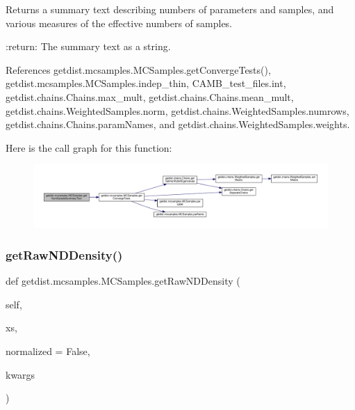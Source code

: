 \begin{DoxyVerb}Returns a summary text describing numbers of parameters and samples, 
and various measures of the effective numbers of samples.

:return: The summary text as a string.
\end{DoxyVerb}
 

References getdist.\+mcsamples.\+M\+C\+Samples.\+get\+Converge\+Tests(), getdist.\+mcsamples.\+M\+C\+Samples.\+indep\+\_\+thin, C\+A\+M\+B\+\_\+test\+\_\+files.\+int, getdist.\+chains.\+Chains.\+max\+\_\+mult, getdist.\+chains.\+Chains.\+mean\+\_\+mult, getdist.\+chains.\+Weighted\+Samples.\+norm, getdist.\+chains.\+Weighted\+Samples.\+numrows, getdist.\+chains.\+Chains.\+param\+Names, and getdist.\+chains.\+Weighted\+Samples.\+weights.

Here is the call graph for this function\+:
\nopagebreak
\begin{figure}[H]
\begin{center}
\leavevmode
\includegraphics[width=350pt]{classgetdist_1_1mcsamples_1_1MCSamples_a49be5a63d735fd9f9436b8f135371a6a_cgraph}
\end{center}
\end{figure}
\mbox{\label{classgetdist_1_1mcsamples_1_1MCSamples_a35fd7d8a3b07a70a66a013e9cb265c95}} 
\subsubsection{\texorpdfstring{get\+Raw\+N\+D\+Density()}{getRawNDDensity()}}
{\footnotesize\ttfamily def getdist.\+mcsamples.\+M\+C\+Samples.\+get\+Raw\+N\+D\+Density (\begin{DoxyParamCaption}\item[{}]{self,  }\item[{}]{xs,  }\item[{}]{normalized = {\ttfamily False},  }\item[{}]{kwargs }\end{DoxyParamCaption})}

